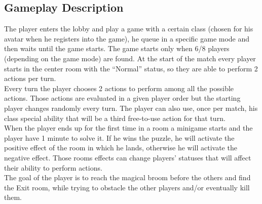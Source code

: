 \subsection{Gameplay Description}
The player enters the lobby and play a game with a certain class (chosen for his avatar when he registers into the game), he queue in a specific game mode and then waits until the game starts. The game starts only when 6/8 players (depending on the game mode) are found. At the start of the match every player starts in the center room with the “Normal” status, so they are able to perform 2 actions per turn.\\
Every turn the player chooses 2 actions to perform among all the possible actions. Those actions are evaluated in a given player order but the starting player changes randomly every turn. The player can also use, once per match, his class special ability that will be a third free-to-use action for that turn.\\
When the player ends up for the first time in a room a minigame starts and the player have 1 minute to solve it. If he wins the puzzle, he will activate the positive effect of the room in which he lands, otherwise he will activate the negative effect. Those rooms effects can change players’ statuses that will affect their ability to perform actions. \\
The goal of the player is to reach the magical broom before the others and find the Exit room, while trying to obstacle the other players and/or eventually kill them.\\